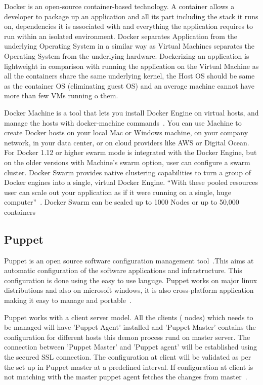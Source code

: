 {     Docker is an open-source container-based technology. A container
     allows a developer to package up an application and all its part
     including the stack it runs on, dependencies it is associated
     with and everything the application requires to run within an
     isolated environment. Docker separates Application from the
     underlying Operating System in a similar way as Virtual Machines
     separates the Operating System from the underlying
     hardware. Dockerizing an application is lightweight in comparison
     with running the application on the Virtual Machine as all the
     containers share the same underlying kernel, the Host OS should
     be same as the container OS (eliminating guest OS) and an average
     machine cannot have more than few VMs running o them.

     Docker Machine is a tool that lets you install Docker Engine on
     virtual hosts, and manage the hosts with docker-machine
     commands~\cite{docker-book}. You can use Machine to create Docker
     hosts on your local Mac or Windows machine, on your company
     network, in your data center, or on cloud providers like AWS or
     Digital Ocean. For Docker 1.12 or higher swarm mode is integrated
     with the Docker Engine, but on the older versions with Machine's
     swarm option, user can configure a swarm cluster. Docker Swarm
     provides native clustering capabilities to turn a group of Docker
     engines into a single, virtual Docker Engine. ``With these pooled
     resources user can scale out your application as if it were
     running on a single, huge computer''~\cite{www-docker}. Docker
     Swarm can be scaled up to 1000 Nodes or up to 50,000 containers
     
\subsection{Puppet}

Puppet is an open source software configuration management
tool~\cite{www-puppet-wiki-puppet}.This aims at automatic
configuration of the software applications and infrastructure. This
configuration is done using the easy to use languge.  Puppet works on
major linux distributions and also on microsoft windows, it is also
cross-platform application making it easy to manage and
portable~\cite{www-puppet-puppet-site}.

Puppet works with a client server model. All the clients ( nodes)
which needs to be managed will have 'Puppet Agent' installed and
'Puppet Master' contains the configuration for different hosts this
demon process rund on master server. The connection between 'Puppet
Master' and 'Puppet agent' will be established using the secured SSL
connection. The configuration at client will be validated as per the
set up in Puppet master at a predefined interval. If configuration at
client is not matching with the master puppet agent fetches the
changes from master~\cite{www-puppet-slashroot}.

}
